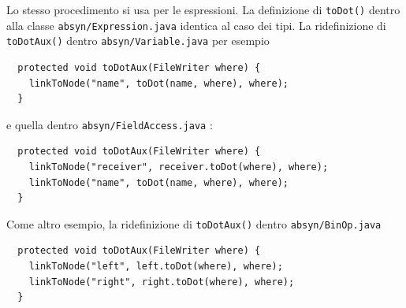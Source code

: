 Lo stesso procedimento si usa per le espressioni.
La definizione di \texttt{toDot()} dentro alla classe
\texttt{absyn/Expression.java} \e
identica al caso dei tipi. La ridefinizione di \texttt{toDotAux()} dentro
\texttt{absyn/Variable.java} \e per esempio
%
\begin{verbatim}
  protected void toDotAux(FileWriter where) {
    linkToNode("name", toDot(name, where), where);
  }
\end{verbatim}
e quella dentro \texttt{absyn/FieldAccess.java} \e:
%
\begin{verbatim}
  protected void toDotAux(FileWriter where) {
    linkToNode("receiver", receiver.toDot(where), where);
    linkToNode("name", toDot(name, where), where);
  }
\end{verbatim}
%
Come altro esempio, la ridefinizione di \texttt{toDotAux()} dentro
\texttt{absyn/BinOp.java} \e
%
\begin{verbatim}
  protected void toDotAux(FileWriter where) {
    linkToNode("left", left.toDot(where), where);
    linkToNode("right", right.toDot(where), where);
  }
\end{verbatim}

